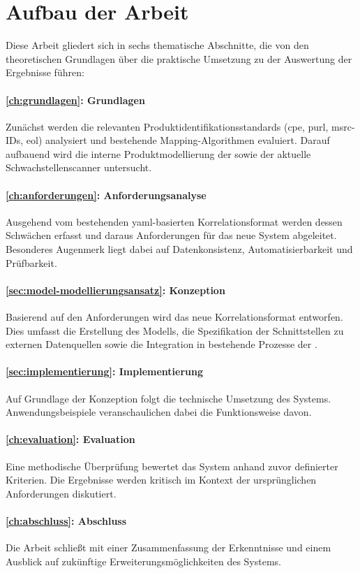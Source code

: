 \section{Aufbau der Arbeit}\label{sec:arbeit-aufbau}

Diese Arbeit gliedert sich in sechs thematische Abschnitte, die von den theoretischen Grundlagen über die praktische Umsetzung zu der Auswertung der Ergebnisse führen:

\paragraph{\autoref{ch:grundlagen}: Grundlagen}
Zunächst werden die relevanten Produktidentifikationsstandards (\acrshort{cpe}, \acrshort{purl}, \acrshort{msrc}-IDs, \acrshort{eol}) analysiert und bestehende Mapping-Algorithmen evaluiert.
Darauf aufbauend wird die interne Produktmodellierung der \metaeffektsp sowie der aktuelle Schwachstellenscanner untersucht.

\paragraph{\autoref{ch:anforderungen}: Anforderungsanalyse}
Ausgehend vom bestehenden \acrshort{yaml}-basierten Korrelationsformat werden dessen Schwächen erfasst und daraus Anforderungen für das neue System abgeleitet.
Besonderes Augenmerk liegt dabei auf Datenkonsistenz, Automatisierbarkeit und Prüfbarkeit.

\paragraph{\autoref{sec:model-modellierungsansatz}: Konzeption}
Basierend auf den Anforderungen wird das neue Korrelationsformat entworfen.
Dies umfasst die Erstellung des Modells, die Spezifikation der Schnittstellen zu externen Datenquellen sowie die Integration in bestehende Prozesse der \metaeffekt.

\paragraph{\autoref{sec:implementierung}: Implementierung}
Auf Grundlage der Konzeption folgt die technische Umsetzung des Systems.
Anwendungsbeispiele veranschaulichen dabei die Funktionsweise davon.

\paragraph{\autoref{ch:evaluation}: Evaluation}
Eine methodische Überprüfung bewertet das System anhand zuvor definierter Kriterien.
Die Ergebnisse werden kritisch im Kontext der ursprünglichen Anforderungen diskutiert.

\paragraph{\autoref{ch:abschluss}: Abschluss}
Die Arbeit schließt mit einer Zusammenfassung der Erkenntnisse und einem Ausblick auf zukünftige Erweiterungsmöglichkeiten des Systems.
